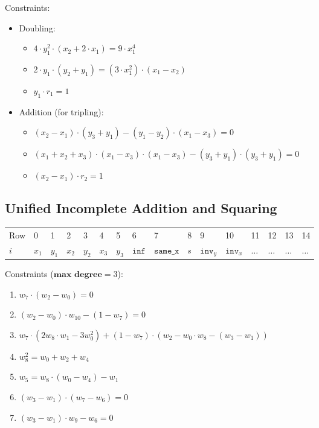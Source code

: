Constraints:
\begin{itemize}
    \item Doubling:
    \begin{itemize}
        \item $4 \cdot y_1^2 \cdot (x_2 + 2 \cdot x_1) = 9 \cdot x_1^4$
        \item $2 \cdot y_1 \cdot (y_2 + y_1) = (3 \cdot x_1^2) \cdot (x_1 - x_2)$
        \item $y_1 \cdot r_1 = 1$
    \end{itemize}
    \item Addition (for tripling):
    \begin{itemize}
        \item $(x_2 - x_1) \cdot (y_3 + y_1) - (y_1 - y_2) \cdot (x_1 - x_3) = 0$
        \item $(x_1 + x_2 + x_3) \cdot (x_1 - x_3) \cdot (x_1 - x_3) - (y_3 + y_1) \cdot (y_3 + y_1) = 0$
        \item $(x_2 - x_1) \cdot r_2 = 1$
    \end{itemize}
\end{itemize}

\subsection{Unified Incomplete Addition and Squaring}

\begin{center}
    \begin{table}[H]
        \begin{tabular}{llllllllllllllll}
            Row   & 0     & 1     & 2     & 3     & 4     & 5     & 6   & 7       & 8       & 9       & 10      & 11      & 12      & 13      & 14      \\
            $i$ & $x_1$ & $y_1$ & $x_2$ & $y_2$ & $x_3$ & $y_3$ & $\texttt{inf}$ & $\texttt{same\_x}$ & $s$ & $\texttt{inv}_y$ & $\texttt{inv}_x$ & $\dots$ & $\dots$ & $\dots$ & $\dots$ \\
        \end{tabular}
    \end{table}
\end{center}

Constraints ($\textbf{max degree} = 3$):
\begin{enumerate}
	 \item $w_7 \cdot (w_2 - w_0) = 0$
    \item $(w_2 - w_0) \cdot w_{10} - (1 - w_7) = 0$
    \item $w_7 \cdot (2w_8 \cdot w_1 - 3w_0^2) + (1 - w_7) \cdot (w_2 - w_0 \cdot w_8 - (w_3 - w_1))$
    \item $w_8^2 = w_0 + w_2 + w_4$
    \item $w_5 = w_8 \cdot (w_0 - w_4) - w_1$
    \item $(w_3 - w_1) \cdot (w_7 - w_6) = 0$
    \item $(w_3 - w_1) \cdot w_9 - w_6 = 0$
\end{enumerate}


